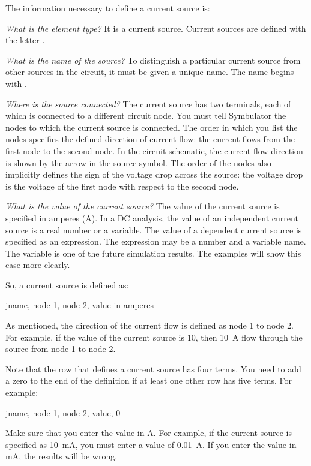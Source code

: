 The information necessary to define a current source is:

\emph{What is the element type?} It is a current source. Current
sources are defined with the letter .

\emph{What is the name of the source?} To distinguish a particular
current source from other sources in the circuit, it must be given a
unique name. The name begins with .

\emph{Where is the source connected?} The current source has two
terminals, each of which is connected to a different circuit node.
You must tell Symbulator the nodes to which the current source is
connected. The order in which you list the nodes specifies the
defined direction of current flow: the current flows from the first
node to the second node. In the circuit schematic, the current flow
direction is shown by the arrow in the source symbol. The order of
the nodes also implicitly defines the sign of the voltage drop
across the source: the voltage drop is the voltage of the first node
with respect to the second node.

\emph{What is the value of the current source?} The value of the
current source is specified in amperes (A). In a DC analysis, the
value of an independent current source is a real number or a
variable. The value of a dependent current source is specified as an
expression. The expression may be a number and a variable name. The
variable is one of the future simulation results. The examples will
show this case more clearly.

So, a current source is defined as:

\begin{entry}
jname, node 1, node 2, value in amperes
\end{entry}

As mentioned, the direction of the current flow is defined as node 1
to node 2. For example, if the value of the current source is 10,
then 10~A flow through the source from node 1 to node 2.

Note that the row that defines a current source has four terms. You
need to add a zero to the end of the definition if at least one
other row has five terms. For example:

\begin{entry}
jname, node 1, node 2, value, 0
\end{entry}

Make sure that you enter the value in A. For example, if the current
source is specified as 10~mA, you must enter a value of 0.01~A. If
you enter the value in mA, the results will be wrong.

